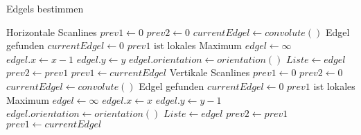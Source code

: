 \begin{algorithm}
	\caption{Edgels bestimmen}
	\label{src:analyseFindedgels}
	\begin{algorithmic}[1]
			\Comment Horizontale Scanlines
				\State $prev1 \gets 0$
				\State $prev2 \gets 0$
					\State $currentEdgel \gets convolute()$
						\Comment Edgel gefunden
					\Else
						\State $currentEdgel \gets 0$
					\EndIf 
						\Comment $prev1$ ist lokales Maximum
						\State $edgel \gets \infty$
						\State $edgel.x \gets x - 1$
						\State $edgel.y \gets y$
						\State $edgel.orientation \gets orientation()$
						\State $Liste \gets edgel$
					\EndIf
					\State $prev2 \gets prev1$
					\State $prev1 \gets currentEdgel$
				\EndFor
			\EndFor
			\Statex
			\Comment Vertikale Scanlines
				\State $prev1 \gets 0$
				\State $prev2 \gets 0$
					\State $currentEdgel \gets convolute()$
						\Comment Edgel gefunden
					\Else
						\State $currentEdgel \gets 0$
					\EndIf
						\Comment $prev1$ ist lokales Maximum
						\State $edgel \gets \infty$
						\State $edgel.x \gets x$
						\State $edgel.y \gets y - 1$
						\State $edgel.orientation \gets orientation()$
						\State $Liste \gets edgel$
					\EndIf
					\State $prev2 \gets prev1$
					\State $prev1 \gets currentEdgel$
				\EndFor
			\EndFor
		\EndProcedure
	\end{algorithmic}
\end{algorithm}
